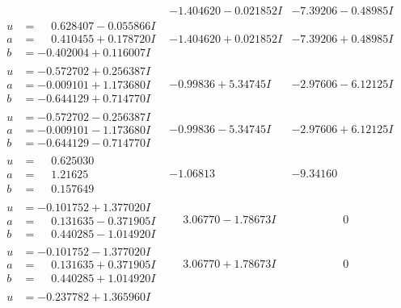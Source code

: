 \documentclass[1p]{elsarticle_modified}
\theoremstyle{definition}
\begin{document}
$$\begin{array}{c|c|c}
 & -1.404620 - 0.021852 I & -7.39206 - 0.48985 I \\ \hline\begin{aligned}
u &= \phantom{-}0.628407 - 0.055866 I \\
a &= \phantom{-}0.410455 + 0.178720 I \\
b &= -0.402004 + 0.116007 I\end{aligned}
 & -1.404620 + 0.021852 I & -7.39206 + 0.48985 I \\ \hline\begin{aligned}
u &= -0.572702 + 0.256387 I \\
a &= -0.009101 + 1.173680 I \\
b &= -0.644129 + 0.714770 I\end{aligned}
 & -0.99836 + 5.34745 I & -2.97606 - 6.12125 I \\ \hline\begin{aligned}
u &= -0.572702 - 0.256387 I \\
a &= -0.009101 - 1.173680 I \\
b &= -0.644129 - 0.714770 I\end{aligned}
 & -0.99836 - 5.34745 I & -2.97606 + 6.12125 I \\ \hline\begin{aligned}
u &= \phantom{-}0.625030\phantom{ +0.000000I} \\
a &= \phantom{-}1.21625\phantom{ +0.000000I} \\
b &= \phantom{-}0.157649\phantom{ +0.000000I}\end{aligned}
 & -1.06813\phantom{ +0.000000I} & -9.34160\phantom{ +0.000000I} \\ \hline\begin{aligned}
u &= -0.101752 + 1.377020 I \\
a &= \phantom{-}0.131635 - 0.371905 I \\
b &= \phantom{-}0.440285 - 1.014920 I\end{aligned}
 & \phantom{-}3.06770 - 1.78673 I & \phantom{-0.000000 } 0 \\ \hline\begin{aligned}
u &= -0.101752 - 1.377020 I \\
a &= \phantom{-}0.131635 + 0.371905 I \\
b &= \phantom{-}0.440285 + 1.014920 I\end{aligned}
 & \phantom{-}3.06770 + 1.78673 I & \phantom{-0.000000 } 0 \\ \hline\begin{aligned}
u &= -0.237782 + 1.365960 I \\

\end{aligned}
\end{array}$$
\end{document}

